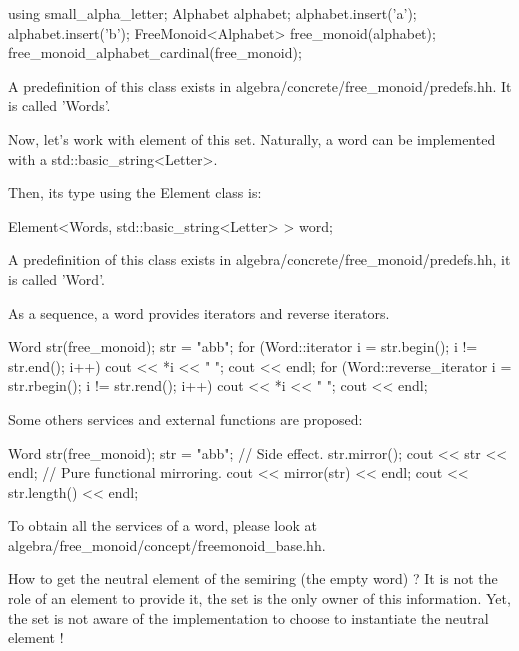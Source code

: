 \documentclass{article}
\begin{document}
\begin{code}
\begin{code}
{
  using small_alpha_letter;
  Alphabet     alphabet;
  alphabet.insert('a');
  alphabet.insert('b');
  FreeMonoid<Alphabet> free_monoid(alphabet);
  free_monoid_alphabet_cardinal(free_monoid);
}
\end{code}

A predefinition of this class exists in
algebra/concrete/free\_monoid/predefs.hh. It is called 'Words'.

Now, let's work with element of this set. Naturally, a word can be
implemented with a std::basic\_string<Letter>.

Then, its type using the Element class is:

\begin{code}
{
  Element<Words, std::basic_string<Letter> > word;
}
\end{code}

A predefinition of this class exists in
algebra/concrete/free\_monoid/predefs.hh, it is called 'Word'.

As a sequence, a word provides iterators and reverse iterators. 

\begin{code}
  Word str(free_monoid);
  str = "abb";
  for (Word::iterator i = str.begin(); i != str.end(); i++)
    cout << *i << " ";
  cout << endl;
  for (Word::reverse_iterator i = str.rbegin(); i != str.rend(); i++)
    cout << *i << " ";
  cout << endl;
\end{code}

Some others services and external functions are proposed:

\begin{code}
  Word str(free_monoid);
  str = "abb";
  // Side effect.
  str.mirror();
  cout << str << endl;
  // Pure functional mirroring.
  cout << mirror(str) << endl;
  cout << str.length() << endl;
\end{code}

To obtain all the services of a word, please look at
algebra/free\_monoid/concept/freemonoid\_base.hh.

How to get the neutral element of the semiring (the empty word) ? It
is not the role of an element to provide it, the set is the only owner
of this information. Yet, the set is not aware of the implementation
to choose to instantiate the neutral element ! 


\end{code}
\end{document}
